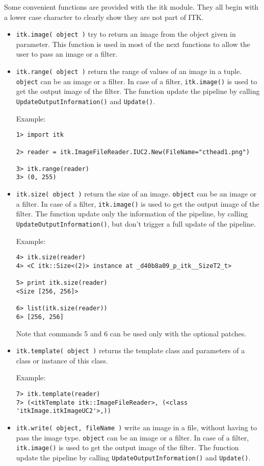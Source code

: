 \documentclass{InsightArticle}
\begin{document}
Some convenient functions are provided with the itk module. They all begin with a lower
case character to clearly show they are not part of ITK.
\begin{itemize}
  \item \verb$itk.image( object )$ try to return an image from the object given in
parameter. This function is used in most of the next functions to allow the user to
pass an image or a filter.

  \item \verb$itk.range( object )$ return the range of values of an image in a tuple.
\verb$object$ can be an image or a filter. In case of a filter, \verb$itk.image()$ is used
to get the output image of the filter. The function update the pipeline by calling
\verb$UpdateOutputInformation()$ and \verb$Update()$.

Example:
\begin{verbatim}
1> import itk

2> reader = itk.ImageFileReader.IUC2.New(FileName="cthead1.png")

3> itk.range(reader)
3> (0, 255)
\end{verbatim}


  \item \verb$itk.size( object )$ return the size of an image.
\verb$object$ can be an image or a filter. In case of a filter, \verb$itk.image()$ is used
to get the output image of the filter. The function update only the information of the
pipeline, by calling \verb$UpdateOutputInformation()$, but don't trigger a full update
of the pipeline.

Example:
\begin{verbatim}
4> itk.size(reader)
4> <C itk::Size<(2)> instance at _d40b8a09_p_itk__SizeT2_t>

5> print itk.size(reader)
<Size [256, 256]>

6> list(itk.size(reader))
6> [256, 256]
\end{verbatim}
Note that commands 5 and 6 can be used only with the optional patches.

  \item \verb$itk.template( object )$ returns the template class and parameters
of a class or instance of this class.

Example:
\begin{verbatim}
7> itk.template(reader)
7> (<itkTemplate itk::ImageFileReader>, (<class 'itkImage.itkImageUC2'>,))
\end{verbatim}

  \item \verb$itk.write( object, fileName )$ write an image in a file, without
having to pass the image type.
\verb$object$ can be an image or a filter. In case of a filter, \verb$itk.image()$ is used
to get the output image of the filter. The function update the pipeline by calling
\verb$UpdateOutputInformation()$ and \verb$Update()$.


\end{itemize}
\end{document}
